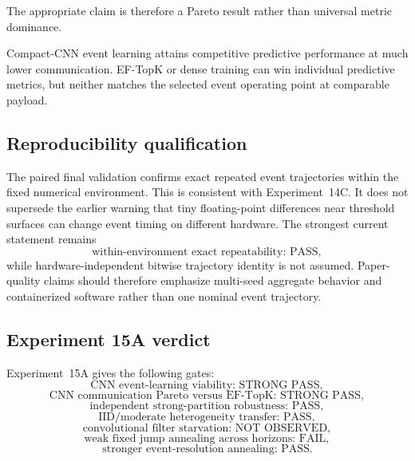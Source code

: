 The appropriate claim is therefore a Pareto result rather than universal metric dominance.
\begin{takeawaybox}[title={Experiment 15A main result}]
Compact-CNN event learning attains competitive predictive performance at much lower communication. EF-TopK or dense training can win individual predictive metrics, but neither matches the selected event operating point at comparable payload.
\end{takeawaybox}

\subsection{Reproducibility qualification}

The paired final validation confirms exact repeated event trajectories within the fixed numerical environment. This is consistent with Experiment~14C. It does not supersede the earlier warning that tiny floating-point differences near threshold surfaces can change event timing on different hardware. The strongest current statement remains
\begin{equation}
\boxed{\text{within-environment exact repeatability: PASS}},
\end{equation}
while hardware-independent bitwise trajectory identity is not assumed. Paper-quality claims should therefore emphasize multi-seed aggregate behavior and containerized software rather than one nominal event trajectory.

\subsection{Experiment 15A verdict}

Experiment~15A gives the following gates:
\begin{equation}
\boxed{\text{CNN event-learning viability: STRONG PASS}},
\end{equation}
\begin{equation}
\boxed{\text{CNN communication Pareto versus EF-TopK: STRONG PASS}},
\end{equation}
\begin{equation}
\boxed{\text{independent strong-partition robustness: PASS}},
\end{equation}
\begin{equation}
\boxed{\text{IID/moderate heterogeneity transfer: PASS}},
\end{equation}
\begin{equation}
\boxed{\text{convolutional filter starvation: NOT OBSERVED}},
\end{equation}
\begin{equation}
\boxed{\text{weak fixed jump annealing across horizons: FAIL}},
\end{equation}
\begin{equation}
\boxed{\text{stronger event-resolution annealing: PASS}}.
\end{equation}

